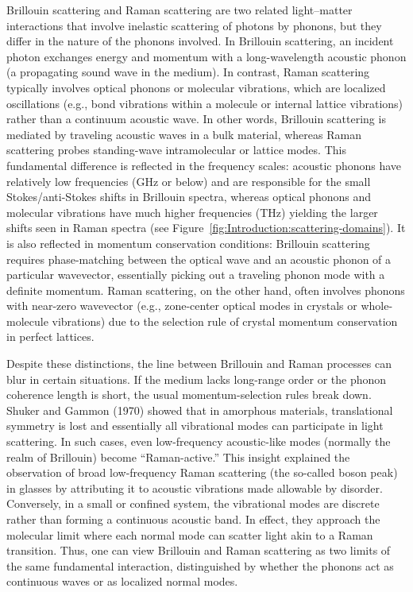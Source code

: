 Brillouin scattering and Raman scattering are two related light–matter interactions that involve inelastic scattering of photons by phonons, but they differ in the nature of the phonons involved. In Brillouin scattering, an incident photon exchanges energy and momentum with a long-wavelength acoustic phonon (a propagating sound wave in the medium). In contrast, Raman scattering typically involves optical phonons or molecular vibrations, which are localized oscillations (e.g., bond vibrations within a molecule or internal lattice vibrations) rather than a continuum acoustic wave. In other words, Brillouin scattering is mediated by traveling acoustic waves in a bulk material, whereas Raman scattering probes standing-wave intramolecular or lattice modes. This fundamental difference is reflected in the frequency scales: acoustic phonons have relatively low frequencies (\si{\giga\hertz} or below) and are responsible for the small Stokes/anti-Stokes shifts in Brillouin spectra, whereas optical phonons and molecular vibrations have much higher frequencies (\si{\tera\hertz}) yielding the larger shifts seen in Raman spectra (see Figure~\ref{fig:Introduction:scattering-domains}). \cite{cardona2007light} It is also reflected in momentum conservation conditions: Brillouin scattering requires phase-matching between the optical wave and an acoustic phonon of a particular wavevector, essentially picking out a traveling phonon mode with a definite momentum. Raman scattering, on the other hand, often involves phonons with near-zero wavevector (e.g., zone-center optical modes in crystals or whole-molecule vibrations) due to the selection rule of crystal momentum conservation in perfect lattices. \cite{ferraro2003introductory}

Despite these distinctions, the line between Brillouin and Raman processes can blur in certain situations. If the medium lacks long-range order or the phonon coherence length is short, the usual momentum-selection rules break down. Shuker and Gammon (1970) \cite{shuker1970raman} showed that in amorphous materials, translational symmetry is lost and essentially all vibrational modes can participate in light scattering. In such cases, even low-frequency acoustic-like modes (normally the realm of Brillouin) become “Raman-active.” This insight explained the observation of broad low-frequency Raman scattering (the so-called boson peak) in glasses by attributing it to acoustic vibrations made allowable by disorder. \cite{duval1990vibrational, winterling1975very, nemanich1977low, martin1974model, malinovsky1986nature, buchenau1986low, malinovsky1987investigation, chumakov2011equivalence} Conversely, in a small or confined system, the vibrational modes are discrete rather than forming a continuous acoustic band. In effect, they approach the molecular limit where each normal mode can scatter light akin to a Raman transition. Thus, one can view Brillouin and Raman scattering as two limits of the same fundamental interaction, distinguished by whether the phonons act as continuous waves or as localized normal modes.

